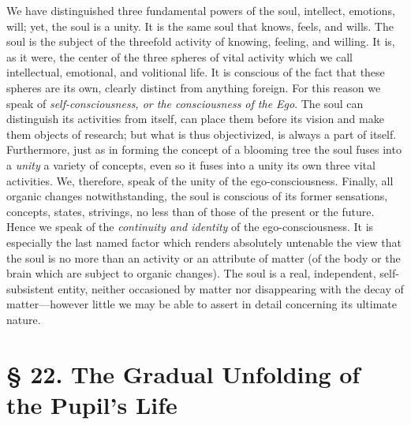 We have distinguished three fundamental powers of the soul, intellect, emotions, will; yet, the soul is a unity. It is the same soul that knows, feels, and wills. The soul is the subject of the threefold activity of knowing, feeling, and willing. It is, as it were, the center of the three spheres of vital activity which we call intellectual, emotional, and volitional
life. It is conscious of the fact that these spheres are its own, clearly distinct from anything foreign. For this reason we speak of \emph{self-consciousness, or the consciousness of the Ego}. The soul can distinguish its activities from itself, can place them before its vision and make them objects of research; but what is thus objectivized, is always a part of itself. Furthermore, just as in forming the concept of a blooming tree the soul fuses into a \emph{unity} a variety of concepts, even so it fuses into a unity its own three vital activities. We, therefore, speak of the unity of the ego-consciousness. Finally, all organic changes notwithstanding, the soul is conscious of its former sensations, concepts, states, strivings, no less than of those of the present or the future. Hence we speak of the \emph{continuity and identity} of the ego-consciousness. It is especially the last named factor which renders absolutely untenable the view that the soul is no more than an activity or an attribute of matter (of the body or the brain which are subject to organic changes). The soul is a real, independent, self-subsistent entity, neither occasioned by matter nor disappearing with the decay of matter—however little we may be able to assert in detail concerning its ultimate nature.

\chapter[§ 22. The Gradual Unfolding]{§ 22. The Gradual Unfolding of the Pupil’s Life}

